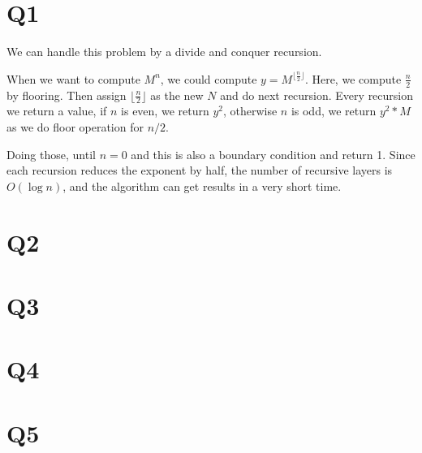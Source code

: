 \documentclass[a4paper]{article}
\begin{document}
	\section*{Q1}
	We can handle this problem by a divide and conquer recursion. 
	
	When we want to compute $M^n$, we could compute $y = M^{\lfloor \frac{n}{2} \rfloor}$. Here, we compute $\frac{n}{2}$ by flooring. Then assign $\lfloor \frac{n}{2}\rfloor$ as the new $N$ and do next recursion. Every recursion we return a value, if $n$ is even, we return $y^2$, otherwise $n$ is odd, we return $y^2 * M$ as we do floor operation for $n / 2$.
	
	Doing those, until $n = 0$ and this is also a boundary condition and return 1. Since each recursion reduces the exponent by half, the number of recursive layers is $O(\log n)$, and the algorithm can get results in a very short time.
	
	\section*{Q2}
		
	
	\section*{Q3}
	
	\section*{Q4}
		
	\section*{Q5}
	
\end{document}
